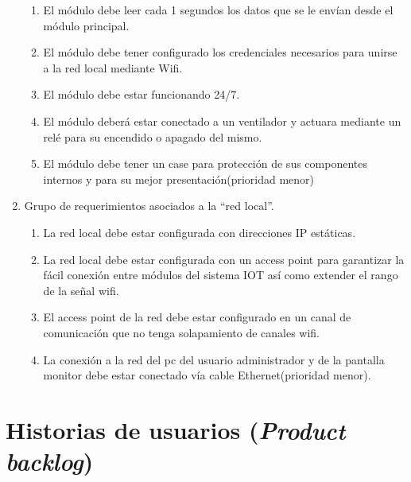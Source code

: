 \documentclass[11pt]{charter}
\begin{document}
\begin{enumerate}
\begin{enumerate}
	\item El módulo debe leer cada 1 segundos los datos que se le envían desde el módulo principal.
	\item El módulo debe tener configurado los credenciales necesarios para unirse a la red local mediante Wifi.
	\item El módulo debe estar funcionando 24/7.
	\item El módulo deberá estar conectado a un ventilador y actuara mediante un relé para su encendido o apagado del mismo.
	\item El módulo debe tener un case para protección de sus componentes internos y para su mejor presentación(prioridad menor)
	\end{enumerate}

\item Grupo de requerimientos asociados a la ``red local''.
	\begin{enumerate}
	\item La red local debe estar configurada con direcciones IP estáticas.
	\item La red local debe estar configurada con un access point para garantizar la fácil conexión entre módulos del sistema IOT así como extender el rango de la señal wifi.
	\item El access point de la red debe estar configurado en un canal de comunicación que no tenga solapamiento de canales wifi.
	\item La conexión a la red del pc del usuario administrador y de la pantalla monitor debe estar conectado vía cable Ethernet(prioridad menor).
	\end{enumerate}

\end{enumerate}

\section{Historias de usuarios (\textit{Product backlog})}
\label{sec:backlog}
\end{document}
